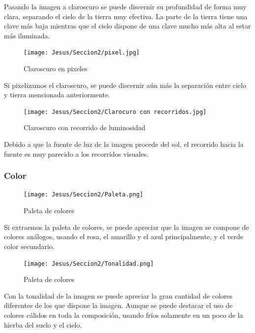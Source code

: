 \documentclass[12pt]{article}
\begin{document}
          Pasando la imagen a claroscuro se puede discernir su profundidad de forma muy clara, separando el cielo de la tierra muy efectiva. 
          La parte de la tierra tiene una clave más baja mientras que el cielo dispone de una clave mucho más alta al estar más iluminada. 
          \newpage
          \begin{figure}[H]
            \centering
            \texttt{[image: Jesus/Seccion2/pixel.jpg]}
            \caption{Claroscuro en pixeles}
          \end{figure}
          Si pixelizamos el claroscuro, se puede discernir aún más la separación entre cielo y tierra mencionada anteriormente. 
          \newpage
          \begin{figure}[H]
            \centering
            \texttt{[image: Jesus/Seccion2/Clarocuro con recorridos.jpg]}
            \caption{Claroscuro con recorrido de luminosidad}
          \end{figure}
          Debido a que la fuente de luz de la imagen procede del sol, el recorrido hacia la fuente es muy parecido a los recorridos visuales. 
          \newpage

        \subsubsection{Color}
        
          \begin{figure}[H]
            \centering
            \texttt{[image: Jesus/Seccion2/Paleta.png]}
            \caption{Paleta de colores}
          \end{figure}
          Si extraemos la paleta de colores, se puede apreciar que la imagen se compone de colores análogos, usando el rosa, el amarillo y el azul principalmente, y el verde color secundario. 
          
          \newpage
          
          \begin{figure}[H]
            \centering
            \texttt{[image: Jesus/Seccion2/Tonalidad.png]}
            \caption{Paleta de colores}
          \end{figure}
          Con la tonalidad de la imagen se puede apreciar la gran cantidad de colores diferentes de los que dispone la imagen. Aunque se puede destacar el uso de colores cálidos en toda la composición, usando fríos solamente en un poco de la hierba del suelo y el cielo. 
          
          \newpage
\end{document}
